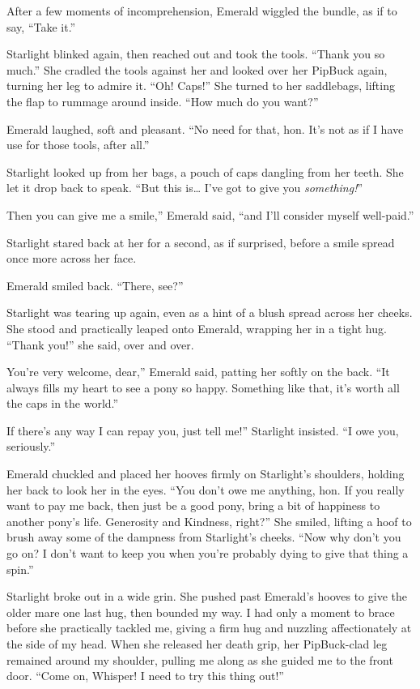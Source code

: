 After a few moments of incomprehension, Emerald wiggled the bundle, as if to say, “Take it.”

Starlight blinked again, then reached out and took the tools. “Thank you so much.” She cradled the tools against her and looked over her PipBuck again, turning her leg to admire it. “Oh! Caps!” She turned to her saddlebags, lifting the flap to rummage around inside. “How much do you want?”

Emerald laughed, soft and pleasant. “No need for that, hon. It’s not as if I have use for those tools, after all.”

Starlight looked up from her bags, a pouch of caps dangling from her teeth. She let it drop back to speak. “But this is… I’ve got to give you \textit{something!}”

\leavevmode{}Then you can give me a smile,” Emerald said, “and I’ll consider myself well-paid.”

Starlight stared back at her for a second, as if surprised, before a smile spread once more across her face.

Emerald smiled back. “There, see?”

Starlight was tearing up again, even as a hint of a blush spread across her cheeks. She stood and practically leaped onto Emerald, wrapping her in a tight hug. “Thank you!” she said, over and over.

\leavevmode{}You’re very welcome, dear,” Emerald said, patting her softly on the back. “It always fills my heart to see a pony so happy. Something like that, it’s worth all the caps in the world.”

\leavevmode{}If there’s any way I can repay you, just tell me!” Starlight insisted. “I owe you, seriously.”

Emerald chuckled and placed her hooves firmly on Starlight’s shoulders, holding her back to look her in the eyes. “You don’t owe me anything, hon. If you really want to pay me back, then just be a good pony, bring a bit of happiness to another pony’s life. Generosity and Kindness, right?” She smiled, lifting a hoof to brush away some of the dampness from Starlight’s cheeks. “Now why don’t you go on? I don’t want to keep you when you’re probably dying to give that thing a spin.”

Starlight broke out in a wide grin. She pushed past Emerald’s hooves to give the older mare one last hug, then bounded my way. I had only a moment to brace before she practically tackled me, giving a firm hug and nuzzling affectionately at the side of my head. When she released her death grip, her PipBuck-clad leg remained around my shoulder, pulling me along as she guided me to the front door. “Come on, Whisper! I need to try this thing out!”

